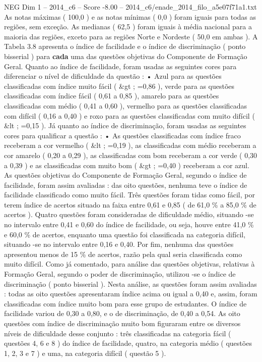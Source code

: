 \begin{textsample}{NEG Dim 1 – 2014\_c6 – Score -8.00 – 2014\_c6/enade\_2014\_filo\_a5e07f71a1.txt}
As notas máximas ( 100,0 ) e as notas mínimas ( 0,0 ) foram iguais para todas as regiões, sem exceção.
As medianas ( 62,5 ) foram iguais à média nacional para a maioria das regiões, exceto para as regiões Norte e Nordeste ( 50,0 em ambas ).
A Tabela 3.8 apresenta o índice de facilidade e o índice de discriminação ( ponto bisserial ) para \textbf{cada} uma das questões objetivas do Componente de Formação Geral.
Quanto ao índice de facilidade, foram usadas as seguintes cores para diferenciar o nível de dificuldade da questão : • Azul para as questões classificadas com índice muito fácil ( \&gt ; =0,86 ), verde para as questões classificadas com índice fácil ( 0,61 a 0,85 ), amarelo para as questões classificadas com médio ( 0,41 a 0,60 ), vermelho para as questões classificadas com difícil ( 0,16 a 0,40 ) e roxo para as questões classificadas com muito difícil ( \&lt ; =0,15 ).
Já quanto ao índice de discriminação, foram usadas as seguintes cores para qualificar a questão : • As questões classificadas com índice fraco receberam a cor vermelho ( \&lt ; =0,19 ), as classificadas com médio receberam a cor amarelo ( 0,20 a 0,29 ), as classificadas com bom receberam a cor verde ( 0,30 a 0,39 ) e as classificadas com muito bom ( \&gt ; =0,40 ) receberam a cor azul.
As questões objetivas do Componente de Formação Geral, segundo o índice de facilidade, foram assim avaliadas : das oito questões, nenhuma teve o índice de facilidade classificado como muito fácil.
Três questões foram tidas como fácil, por terem índice de acertos situado na faixa entre 0,61 e 0,85 ( de 61,0 \% a 85,0 \% de acertos ).
Quatro questões foram consideradas de dificuldade médio, situando -se no intervalo entre 0,41 e 0,60 do índice de facilidade, ou seja, houve entre 41,0 \% e 60,0 \% de acertos, enquanto uma questão foi classificada na categoria difícil, situando -se no intervalo entre 0,16 e 0,40.
Por fim, nenhuma das questões apresentou menos de 15 \% de acertos, razão pela qual seria classificada como muito difícil.
Como já comentado, para análise das questões objetivas, relativas à Formação Geral, segundo o poder de discriminação, utilizou -se o índice de discriminação ( ponto bisserial ).
Nesta análise, as questões foram assim avaliadas : todas as oito questões apresentaram índice acima ou igual a 0,40 e, assim, foram classificadas com índice muito bom para esse grupo de estudantes.
O índice de facilidade variou de 0,30 a 0,80, e o de discriminação, de 0,40 a 0,54.
As oito questões com índice de discriminação muito bom figuraram entre os diversos níveis de dificuldade desse conjunto : três classificadas na categoria fácil ( questões 4, 6 e 8 ) do índice de facilidade, quatro, na categoria médio ( questões 1, 2, 3 e 7 ) e uma, na categoria difícil ( questão 5 ).

\end{textsample}
